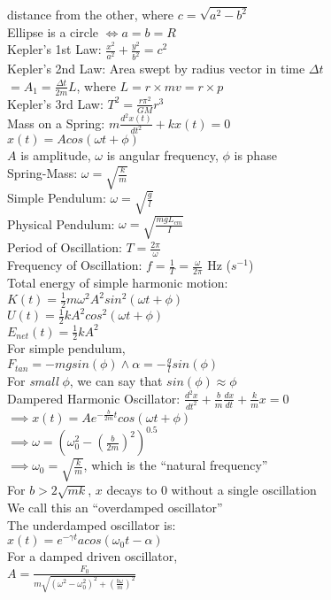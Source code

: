 \documentclass{minimal}
\begin{document}
\begin{multicols}{2}
distance from the other, where $c = \sqrt{a^2 - b^2}$\\
Ellipse is a circle $\iff a = b = R$\\
Kepler's 1st Law: \(\frac{x^2}{a^2} + \frac{y^2}{b^2} = c^2\)\\ 
Kepler's 2nd Law: Area swept by radius vector in time $\Delta t$\\
\(= A_1 = \frac{\Delta t}{2m}L\), where \(L = r \times mv = r \times p\)\\
Kepler's 3rd Law: \(T^2 = \frac{r \pi^2}{GM}r^3\)\\
Mass on a Spring: \(m\frac{d^2 x(t)}{dt^2} + kx(t) = 0\)\\
\(x(t) = A cos(\omega t + \phi)\)\\
$A$ is amplitude, $\omega$ is angular frequency, $\phi$ is phase\\
Spring-Mass: \(\omega = \sqrt{\frac{k}{m}}\)\\
Simple Pendulum: \(\omega = \sqrt{\frac{g}{l}}\)\\
Physical Pendulum: \(\omega = \sqrt{\frac{mgL_{cm}}{I}}\)\\
Period of Oscillation: \(T = \frac{2\pi}{\omega}\)\\
Frequency of Oscillation: \(f = \frac{1}{T} = \frac{\omega}{2\pi}\) Hz ($s^{-1}$)\\
Total energy of simple harmonic motion:\\
\(K(t) = \frac{1}{2}m\omega^2 A^2 sin^2 (\omega t + \phi)\)\\
\(U(t) = \frac{1}{2}kA^2 cos^2 (\omega t + \phi)\)\\
\(E_{net}(t) = \frac{1}{2}kA^2\)\\
For simple pendulum, \\
\(F_{tan} = -mgsin(\phi) \land \alpha = -\frac{g}{l}sin(\phi)\)\\
For \textit{small} $\phi$, we can say that $sin(\phi) \approx \phi$\\
Dampered Harmonic Oscillator: \(\frac{d^2 x}{dt^2} + \frac{b}{m}\frac{dx}{dt} + \frac{k}{m}x = 0\)\\
\(\implies x(t) = Ae^{-\frac{b}{2m}t}cos(\omega t + \phi)\)\\
\(\implies \omega = (\omega_{0}^2 - (\frac{b}{2m})^2)^{0.5}\)\\
\(\implies \omega_0 = \sqrt{\frac{k}{m}}\), which is the ``natural frequency''\\
For $b > 2\sqrt{mk}$, $x$ decays to 0 without a single oscillation\\
We call this an ``overdamped oscillator''\\
The underdamped oscillator is: \\
\(x(t) = e^{-\gamma t}acos(\omega_0 t - \alpha)\)\\
For a damped driven oscillator,\\
\(A = \frac{F_0}{m\sqrt{(\omega^2 - \omega_{0}^2)^2 + (\frac{b\omega}{m})^2}}\)
\end{multicols}
\end{document}
